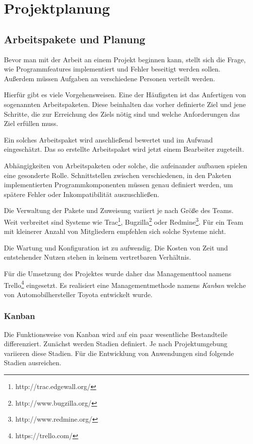 \section{Projektplanung}
\label{proj}

\subsection{Arbeitspakete und Planung}
Bevor man mit der Arbeit an einem Projekt beginnen kann, stellt sich die Frage, wie Programmfeatures implementiert und Fehler beseitigt werden sollen. Außerdem müssen Aufgaben an verschiedene Personen verteilt werden.

Hierfür gibt es viele Vorgehensweisen. Eine der Häufigsten ist das Anfertigen von sogenannten Arbeitspaketen. Diese beinhalten das vorher definierte Ziel und jene Schritte, die zur Erreichung des Ziels nötig sind und welche Anforderungen das Ziel erfüllen muss.

Ein solches Arbeitspaket wird anschließend bewertet und im Aufwand eingeschätzt. Das so erstellte Arbeitspaket wird jetzt einem Bearbeiter zugeteilt.

Abhängigkeiten von Arbeitspaketen oder solche, die aufeinander aufbauen spielen eine gesonderte Rolle. Schnittstellen zwischen verschiedenen, in den Paketen implementierten Programmkomponenten müssen genau definiert werden, um spätere Fehler oder Inkompatibilität auszuschließen.

Die Verwaltung der Pakete und Zuweisung variiert je nach Größe des Teams. Weit verbreitet sind Systeme wie Trac\footnote{http://trac.edgewall.org/}, Bugzilla\footnote{http://www.bugzilla.org/} oder Redmine\footnote{http://www.redmine.org/}. Für ein Team mit kleinerer Anzahl von Mitgliedern empfehlen sich solche Systeme nicht.

Die Wartung und Konfiguration ist zu aufwendig. Die Kosten von Zeit und entstehender Nutzen stehen in keinem vertretbaren Verhältnis.

Für die Umsetzung des Projektes wurde daher das Managementtool namens Trello\footnote{https://trello.com/} eingesetzt. Es realisiert eine Managementmethode namens \textit{Kanban} welche von Automobilhersteller Toyota entwickelt wurde.

\subsubsection{Kanban}

Die Funktionsweise von Kanban wird auf ein paar wesentliche Bestandteile differenziert. Zunächst werden Stadien definiert. Je nach Projektumgebung variieren diese Stadien. Für die Entwicklung von Anwendungen sind folgende Stadien ausreichen. 

